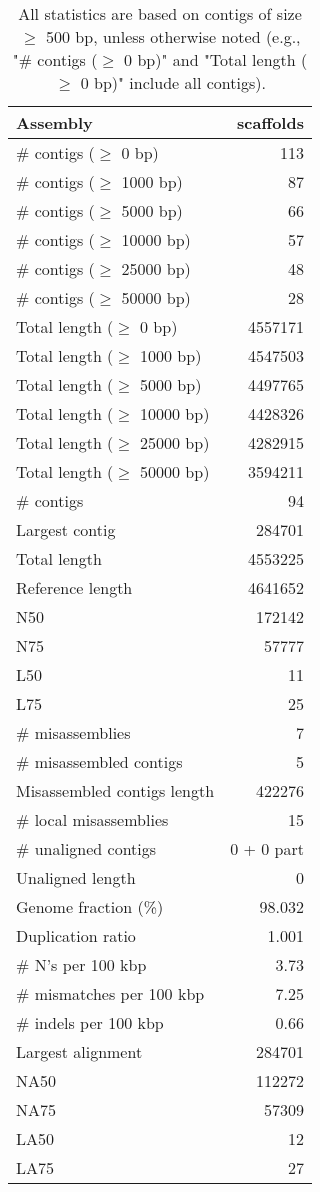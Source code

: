 \documentclass[12pt,a4paper]{article}
\begin{document}
\begin{table}[ht]
\begin{center}
\caption{All statistics are based on contigs of size $\geq$ 500 bp, unless otherwise noted (e.g., "\# contigs ($\geq$ 0 bp)" and "Total length ($\geq$ 0 bp)" include all contigs).}
\begin{tabular}{|l*{1}{|r}|}
\hline
Assembly & scaffolds \\ \hline
\# contigs ($\geq$ 0 bp) & 113 \\ \hline
\# contigs ($\geq$ 1000 bp) & 87 \\ \hline
\# contigs ($\geq$ 5000 bp) & 66 \\ \hline
\# contigs ($\geq$ 10000 bp) & 57 \\ \hline
\# contigs ($\geq$ 25000 bp) & 48 \\ \hline
\# contigs ($\geq$ 50000 bp) & 28 \\ \hline
Total length ($\geq$ 0 bp) & 4557171 \\ \hline
Total length ($\geq$ 1000 bp) & 4547503 \\ \hline
Total length ($\geq$ 5000 bp) & 4497765 \\ \hline
Total length ($\geq$ 10000 bp) & 4428326 \\ \hline
Total length ($\geq$ 25000 bp) & 4282915 \\ \hline
Total length ($\geq$ 50000 bp) & 3594211 \\ \hline
\# contigs & 94 \\ \hline
Largest contig & 284701 \\ \hline
Total length & 4553225 \\ \hline
Reference length & 4641652 \\ \hline
N50 & 172142 \\ \hline
N75 & 57777 \\ \hline
L50 & 11 \\ \hline
L75 & 25 \\ \hline
\# misassemblies & 7 \\ \hline
\# misassembled contigs & 5 \\ \hline
Misassembled contigs length & 422276 \\ \hline
\# local misassemblies & 15 \\ \hline
\# unaligned contigs & 0 + 0 part \\ \hline
Unaligned length & 0 \\ \hline
Genome fraction (\%) & 98.032 \\ \hline
Duplication ratio & 1.001 \\ \hline
\# N's per 100 kbp & 3.73 \\ \hline
\# mismatches per 100 kbp & 7.25 \\ \hline
\# indels per 100 kbp & 0.66 \\ \hline
Largest alignment & 284701 \\ \hline
NA50 & 112272 \\ \hline
NA75 & 57309 \\ \hline
LA50 & 12 \\ \hline
LA75 & 27 \\ \hline
\end{tabular}
\end{center}
\end{table}
\end{document}
